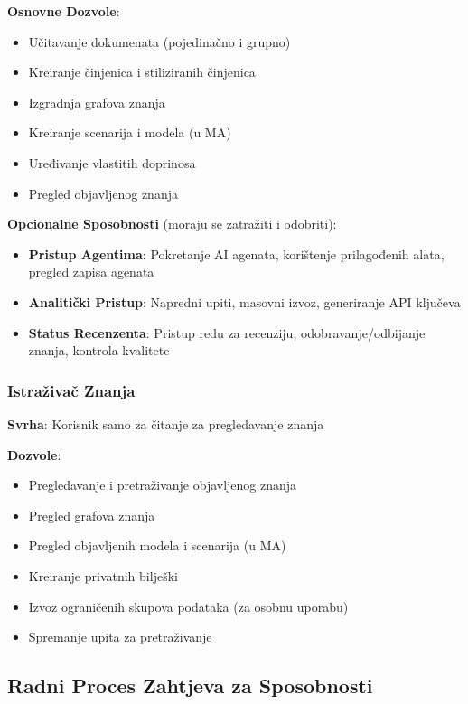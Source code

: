 \documentclass[12pt,a4paper]{article}
\begin{document}
\textbf{Osnovne Dozvole}:
\begin{itemize}
    \item Učitavanje dokumenata (pojedinačno i grupno)
    \item Kreiranje činjenica i stiliziranih činjenica
    \item Izgradnja grafova znanja
    \item Kreiranje scenarija i modela (u MA)
    \item Uređivanje vlastitih doprinosa
    \item Pregled objavljenog znanja
\end{itemize}

\textbf{Opcionalne Sposobnosti} (moraju se zatražiti i odobriti):
\begin{itemize}
    \item \textbf{Pristup Agentima}: Pokretanje AI agenata, korištenje prilagođenih alata, pregled zapisa agenata
    \item \textbf{Analitički Pristup}: Napredni upiti, masovni izvoz, generiranje API ključeva
    \item \textbf{Status Recenzenta}: Pristup redu za recenziju, odobravanje/odbijanje znanja, kontrola kvalitete
\end{itemize}

\subsubsection{Istraživač Znanja}
\textbf{Svrha}: Korisnik samo za čitanje za pregledavanje znanja

\textbf{Dozvole}:
\begin{itemize}
    \item Pregledavanje i pretraživanje objavljenog znanja
    \item Pregled grafova znanja
    \item Pregled objavljenih modela i scenarija (u MA)
    \item Kreiranje privatnih bilješki
    \item Izvoz ograničenih skupova podataka (za osobnu uporabu)
    \item Spremanje upita za pretraživanje
\end{itemize}

\subsection{Radni Proces Zahtjeva za Sposobnosti}
\end{document}
